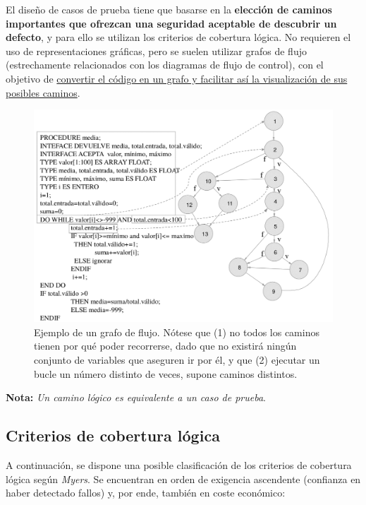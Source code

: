 El diseño de casos de prueba tiene que basarse en la \textbf{elección de caminos importantes que ofrezcan una seguridad aceptable de descubrir un defecto}, y para ello se utilizan los criterios de cobertura lógica. No requieren el uso de representaciones gráficas, pero se suelen utilizar grafos de flujo (estrechamente relacionados con los diagramas de flujo de control), con el objetivo de \uline{convertir el código en un grafo y facilitar así la visualización de sus posibles caminos}.

\begin{figure}[H]
    \centering
    \includegraphics[width=0.8\linewidth]{Resources/Tema6/Ejemplo_GrafoFlujo.png}
    \caption{Ejemplo de un grafo de flujo. Nótese que (1) no todos los caminos tienen por qué poder recorrerse, dado que no existirá ningún conjunto de variables que aseguren ir por él, y que (2) ejecutar un bucle un número distinto de veces, supone caminos distintos.}
\end{figure}

\textbf{Nota:} \textit{Un camino lógico es equivalente a un caso de prueba}.

\subsection{Criterios de cobertura lógica}

A continuación, se dispone una posible clasificación de los criterios de cobertura lógica según \textit{Myers}. Se encuentran en orden de exigencia ascendente (confianza en haber detectado fallos) y, por ende, también en coste económico:

